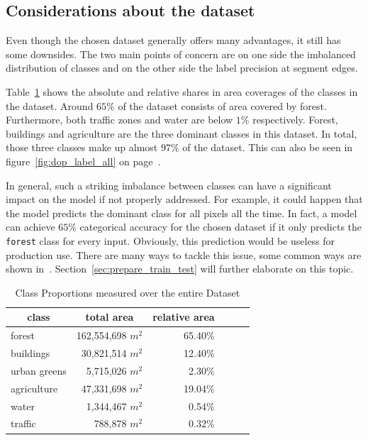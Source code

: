\subsection{Considerations about the dataset}
\label{sec:dataset_considerations}

Even though the chosen dataset generally offers many advantages, it still has some downsides. The two main points of concern are on one side the imbalanced distribution of classes and on the other side the label precision at segment edges.

Table~\ref{tab:seg-breakdown} shows the absolute and relative shares in area coverages of the classes in the dataset. Around $65\%$ of the dataset consists of area covered by forest. Furthermore, both traffic zones and water are below $1\%$ respectively. Forest, buildings and agriculture are the three dominant classes in this dataset. In total, those three classes make up almost $97\%$ of the dataset. This can also be seen in figure~\ref{fig:dop_label_all} on page~\pageref{fig:dop_label_all}.

In general, such a striking imbalance between classes can have a significant impact on the model if not properly addressed. For example, it could happen that the model predicts the dominant class for all pixels all the time. In fact, a model can achieve $65\%$ categorical accuracy for the chosen dataset if it only predicts the \texttt{forest} class for every input. Obviously, this prediction would be useless for production use. There are many ways to tackle this issue, some common ways are shown in~\cite{imbalanced_data09}. Section~\ref{sec:prepare_train_test} will further elaborate on this topic.

\begin{table}
\centering
\caption{Class Proportions measured over the entire Dataset}
\label{tab:seg-breakdown}
\begin{tabular}{|l|r|r|r|r|r|}
\hline
\multicolumn{1}{|c|}{\textbf{class}} &
  \multicolumn{1}{c|}{\textbf{total area}} &
  \multicolumn{1}{c|}{\textbf{relative area}} \\ \hline
forest       & 162,554,698 $m^2$ & 65.40\%  \\ \hline
buildings    & 30,821,514  $m^2$ & 12.40\%  \\ \hline
urban greens & 5,715,026   $m^2$ & 2.30\%   \\ \hline
agriculture  & 47,331,698  $m^2$ & 19.04\%  \\ \hline
water        & 1,344,467   $m^2$ & 0.54\%   \\ \hline
traffic      & 788,878     $m^2$ & 0.32\%   \\ \hline
\end{tabular}
\end{table}

